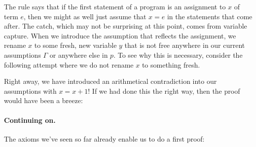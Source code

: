 \documentclass[11pt,twoside]{scrartcl}
\begin{document}
The rule  says that if the first statement of a program is an assignment to $x$ of term $e$, then we might as well just assume that $x = e$ in the statements that come after.
The catch, which may not be surprising at this point, comes from variable capture.
When we introduce the assumption that reflects the assignment, we rename $x$ to some fresh, new variable $y$ that is not free anywhere in our current assumptions $\Gamma$ or anywhere else in $p$.
To see why this is necessary, consider the following attempt where we do not rename $x$ to something fresh.
\begin{sequentdeduction}[array]
 {
}
\end{sequentdeduction}
Right away, we have introduced an arithmetical contradiction into our assumptions with $x = x + 1$!
If we had done this the right way, then the proof would have been a breeze:
\begin{sequentdeduction}[array]
 {
}
\end{sequentdeduction}

\paragraph{Continuing on.} 
The axioms we've seen so far already enable us to do a first proof:
\begin{sequentdeduction}[array]
{\lsequent{} {}}
\end{sequentdeduction}
\end{document}
